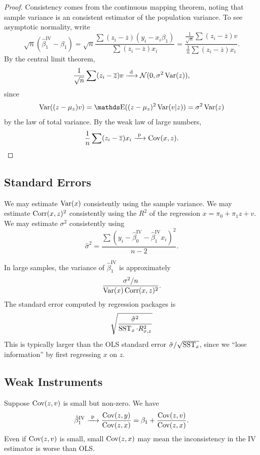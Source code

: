 \documentclass[letterpaper, 10pt]{article}
\DeclareMathOperator{\IV}{IV}
\begin{document}
\begin{proof}
  Consistency comes from the continuous mapping theorem, noting that sample variance is an consistent estimator of the population variance.
  To see asymptotic normality, write
  \[
    \sqrt{n} (\hat{\beta}_1^{\IV} - \beta_1) 
    = \sqrt{n} \frac{\sum (z_i - \overline{z}) (y_i - x_i \beta_1)}{\sum (z_i  -\overline{z}) x_i}
    = \frac{\frac{1}{\sqrt{n}} \sum (z_i - \overline{z}) v}{\frac{1}{n} \sum (z_i - \overline{z}) x_i}.
  \]
  By the central limit theorem,
  \[
    \frac{1}{\sqrt{n}} \sum (z_i - \overline{z}) v
    \xrightarrow{\ \mathrm{d}\ } \mathcal{N}(0, \sigma^2 \operatorname{Var}(z)),
  \]
  since
  \[
    \Var((z - \mu_z) v)
    = \E((z - \mu_z)^2\Var(v|z))
    = \sigma^2 \Var(z)
  \]
  by the law of total variance.
  By the weak law of large numbers,
  \[
    \frac{1}{n} \sum (z_i - \overline{z}) x_i
    \xrightarrow{\ \mathrm{p}\ } \operatorname{Cov}(x, z).
  \]
\end{proof}

\subsection{Standard Errors}
\begin{remark}
  We may estimate \(\operatorname{Var}(x)\) consistently using the sample variance.
  We may estimate \(\operatorname{Corr}(x, z)^2\) consistently using the \(R^2\) of the regression \(x = \pi_0 + \pi_1 z + v\).
  We may estimate \(\sigma^2\) consistently using
  \[
    \hat{\sigma}^2
    = \frac{\sum (y_i - \hat{\beta}_0^{\IV} - \hat{\beta}_1^{\IV} x_i)^2}{n - 2}.
  \]
\end{remark}

In large samples, the variance of \(\hat{\beta}_1^{\IV}\) is approximately
\[
  \frac{\sigma^2 / n}{\operatorname{Var}(x) \operatorname{Corr}(x, z)^2}.
\]
The standard error computed by regression packages is
\[
  \sqrt{\frac{\hat{\sigma}^2}{\operatorname{SST}_x \cdot R_{x, z}^2}}
\]
This is typically larger than the OLS standard error \(\hat{\sigma} / \sqrt{\operatorname{SST}_x}\), since we ``lose information'' by first regressing \(x\) on \(z\).


\subsection{Weak Instruments}
Suppose \(\operatorname{Cov}(z, v)\) is small but non-zero.
We have
\[
  \hat{\beta}_1^{\IV}
  \longprobto \frac{\Cov(z, y)}{\Cov(z, x)}
  = \beta_1 + \frac{\Cov(z, v)}{\Cov(z, x)}.
\]
Even if \(\operatorname{Cov}(z, v)\) is small, small \(\operatorname{Cov}(z, x)\) may mean the inconsistency in the IV estimator is worse than OLS.
\end{document}
